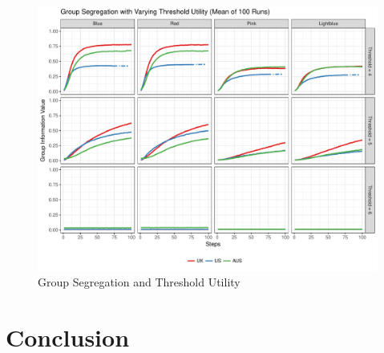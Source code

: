 \documentclass[12pt, a4paper]{article}
\begin{document}
\begin{figure}[bp!]
	\centering
	\caption{Group Segregation and Threshold Utility}
	\includegraphics[scale=0.6]{./Plots/th_grp_ratios.pdf}
\end{figure}



\section{\label{sec_conc}Conclusion}




\newpage

%
%
\end{document}

